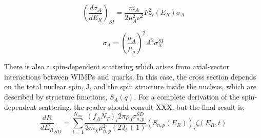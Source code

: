 \par
\begin{equation}
    (\frac{d\sigma_A}{dE_R})_{SI} = \frac{m_A}{2\mu_A^2 \nu^2}F_{SI}^2 (E_R) \sigma_A
\end{equation}

\begin{equation}
    \sigma_A = (\frac{\mu_A}{\mu_p})^2 A^2 \sigma_N^{SI}
\end{equation}


\par
There is also a spin-dependent scattering which arises from axial-vector interactions between WIMPs and quarks.
In this case, the cross section depends on the total nuclear spin, J, and the spin structure inside the nucleus, which are described by structure functions, $S_A(q)$.
For a complete derivation of the spin-dependent scattering, the reader should consult XXX, but the final result is;
\begin{equation}
    \frac{dR}{dE_R}_{SD} = \sum_{i=1}^{N_{iso}} \frac{(f_A N_T)_i 2\pi \rho_0 \sigma_{n,p}^{SD}}{3m_\chi \mu_{n,p}^2 (2J_i + 1)} (S_{n,p} (E_R))_i \zeta (E_R,t)
\end{equation}

